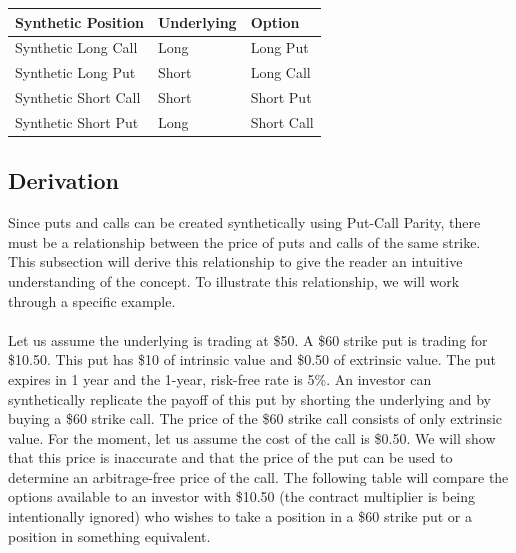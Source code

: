 \documentclass[11pt, oneside]{book}
\begin{document}
\begin{center}
\begin{tabular}{|m{4cm}|m{2.1cm}|m{2cm}|}
    \hline
    \textbf{Synthetic Position} & \textbf{Underlying} & \textbf{Option} \\ 
    \hline
    Synthetic Long Call & Long & Long Put \\ 
    \hline
    Synthetic Long Put & Short & Long Call \\ 
    \hline
    Synthetic Short Call & Short & Short Put \\ 
    \hline
    Synthetic Short Put & Long & Short Call \\ 
    \hline
\end{tabular}
\end{center}

\subsection{Derivation} \label{Options-PutCall-Derivation}
Since puts and calls can be created synthetically using Put-Call Parity, there must be a relationship between the price of puts and calls of the same strike. This subsection will derive this relationship to give the reader an intuitive understanding of the concept. To illustrate this relationship, we will work through a specific example.\\
\\
Let us assume the underlying is trading at \$50. A \$60 strike put is trading for \$10.50. This put has \$10 of intrinsic value and \$0.50 of extrinsic value. The put expires in 1 year and the 1-year, risk-free rate is 5\%. An investor can synthetically replicate the payoff of this put by shorting the underlying and by buying a \$60 strike call. The price of the \$60 strike call consists of only extrinsic value. For the moment, let us assume the cost of the call is \$0.50. We will show that this price is inaccurate and that the price of the put can be used to determine an arbitrage-free price of the call. The following table will compare the options available to an investor with \$10.50 (the contract multiplier is being intentionally ignored) who wishes to take a position in a \$60 strike put or a position in something equivalent.
\end{document}
